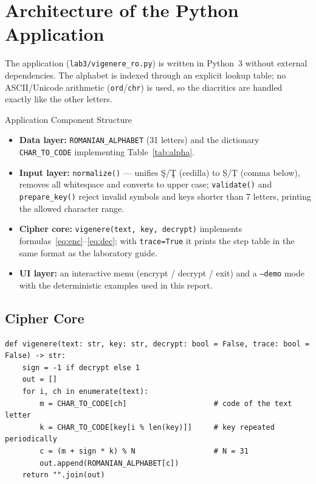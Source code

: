 \documentclass[12pt,a4paper]{article}
\begin{document}
\section{Architecture of the Python Application}
The application (\texttt{lab3/vigenere\_ro.py}) is written in Python~3 without external
dependencies. The alphabet is indexed through an explicit lookup table; no ASCII/Unicode
arithmetic (\texttt{ord}/\texttt{chr}) is used, so the diacritics are handled exactly like the
other letters.

\begin{infobox}{Application Component Structure}
\begin{itemize}[leftmargin=*]
  \item \textbf{Data layer:} \texttt{ROMANIAN\_ALPHABET} (31 letters) and the dictionary
        \texttt{CHAR\_TO\_CODE} implementing Table~\ref{tab:alpha}.
  \item \textbf{Input layer:} \texttt{normalize()} — unifies Ş/Ţ (cedilla) to Ș/Ț (comma below),
        removes all whitespace and converts to upper case; \texttt{validate()} and
        \texttt{prepare\_key()} reject invalid symbols and keys shorter than 7 letters, printing
        the allowed character range.
  \item \textbf{Cipher core:} \texttt{vigenere(text, key, decrypt)} implements
        formulas~\eqref{eq:enc}–\eqref{eq:dec}; with \texttt{trace=True} it prints the step
        table in the same format as the laboratory guide.
  \item \textbf{UI layer:} an interactive menu (encrypt / decrypt / exit) and a
        \texttt{--demo} mode with the deterministic examples used in this report.
\end{itemize}
\end{infobox}

\subsection{Cipher Core}
\begin{lstlisting}[style=py, caption={Core of the Vigenère implementation (excerpt)}]
def vigenere(text: str, key: str, decrypt: bool = False, trace: bool = False) -> str:
    sign = -1 if decrypt else 1
    out = []
    for i, ch in enumerate(text):
        m = CHAR_TO_CODE[ch]                    # code of the text letter
        k = CHAR_TO_CODE[key[i % len(key)]]     # key repeated periodically
        c = (m + sign * k) % N                  # N = 31
        out.append(ROMANIAN_ALPHABET[c])
    return "".join(out)
\end{lstlisting}
\end{document}
